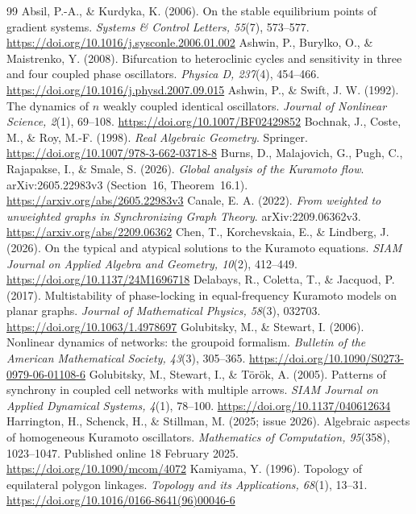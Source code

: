 \documentclass[11pt,a4paper]{article}
\theoremstyle{definition}\newtheorem{conjecture}{Conjecture}
\theoremstyle{remark}\newtheorem{remark}[theorem]{Remark}
\begin{document}
\begin{thebibliography}{99}
 Absil, P.-A., \& Kurdyka, K. (2006). On the stable equilibrium points of gradient systems. \emph{Systems \& Control Letters, 55}(7), 573--577. \url{https://doi.org/10.1016/j.sysconle.2006.01.002}
 Ashwin, P., Burylko, O., \& Maistrenko, Y. (2008). Bifurcation to heteroclinic cycles and sensitivity in three and four coupled phase oscillators. \emph{Physica D, 237}(4), 454--466. \url{https://doi.org/10.1016/j.physd.2007.09.015}
 Ashwin, P., \& Swift, J. W. (1992). The dynamics of $n$ weakly coupled identical oscillators. \emph{Journal of Nonlinear Science, 2}(1), 69--108. \url{https://doi.org/10.1007/BF02429852}
 Bochnak, J., Coste, M., \& Roy, M.-F. (1998). \emph{Real Algebraic Geometry}. Springer. \url{https://doi.org/10.1007/978-3-662-03718-8}
 Burns, D., Malajovich, G., Pugh, C., Rajapakse, I., \& Smale, S. (2026). \emph{Global analysis of the Kuramoto flow}. arXiv:2605.22983v3 (Section~16, Theorem~16.1). \url{https://arxiv.org/abs/2605.22983v3}
 Canale, E. A. (2022). \emph{From weighted to unweighted graphs in Synchronizing Graph Theory}. arXiv:2209.06362v3. \url{https://arxiv.org/abs/2209.06362}
 Chen, T., Korchevskaia, E., \& Lindberg, J. (2026). On the typical and atypical solutions to the Kuramoto equations. \emph{SIAM Journal on Applied Algebra and Geometry, 10}(2), 412--449. \url{https://doi.org/10.1137/24M1696718}
 Delabays, R., Coletta, T., \& Jacquod, P. (2017). Multistability of phase-locking in equal-frequency Kuramoto models on planar graphs. \emph{Journal of Mathematical Physics, 58}(3), 032703. \url{https://doi.org/10.1063/1.4978697}
 Golubitsky, M., \& Stewart, I. (2006). Nonlinear dynamics of networks: the groupoid formalism. \emph{Bulletin of the American Mathematical Society, 43}(3), 305--365. \url{https://doi.org/10.1090/S0273-0979-06-01108-6}
 Golubitsky, M., Stewart, I., \& T\"or\"ok, A. (2005). Patterns of synchrony in coupled cell networks with multiple arrows. \emph{SIAM Journal on Applied Dynamical Systems, 4}(1), 78--100. \url{https://doi.org/10.1137/040612634}
 Harrington, H., Schenck, H., \& Stillman, M. (2025; issue 2026). Algebraic aspects of homogeneous Kuramoto oscillators. \emph{Mathematics of Computation, 95}(358), 1023--1047. Published online 18 February 2025. \url{https://doi.org/10.1090/mcom/4072}
 Kamiyama, Y. (1996). Topology of equilateral polygon linkages. \emph{Topology and its Applications, 68}(1), 13--31. \url{https://doi.org/10.1016/0166-8641(96)00046-6}

\end{thebibliography}
\end{document}

